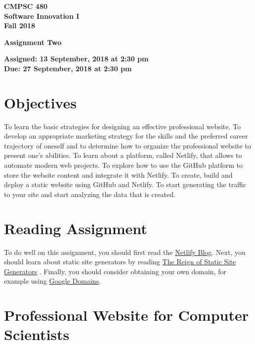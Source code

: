 \documentclass[11pt]{article}
\newcommand{\assignmentduedate}{27 September}
\newcommand{\assignmentassignedate}{ 13 September}
\newcommand{\assignmentnumber}{Two}
\newcommand{\labyear}{2018}
\newcommand{\labtime}{2:30 pm}
\newcommand{\assigneddate}{Assigned:  \assignmentassignedate, \labyear{} at \labtime{}}
\newcommand{\duedate}{Due:  \assignmentduedate, \labyear{} at \labtime{} }
\newcommand{\labtitle}[1]
{
  \begin{center}
    \begin{center}
      \bf
      CMPSC 480 \\ Software Innovation I\\
      Fall 2018\\
      \medskip
    \end{center}
    \bf
    #1
  \end{center}
}
\begin{document}
\thispagestyle{empty}

\labtitle{Assignment \assignmentnumber{} }
\begin{center} \textbf{ \assigneddate{} \\ \duedate{} } \end{center} 
\noindent \textbf{ }

\vspace{-0.05in}
\section*{Objectives}

To learn the basic strategies for designing an effective professional website. To develop an appropriate marketing strategy for the skills and the preferred career trajectory of oneself and to determine how to organize the professional website to present one's abilities. To learn about a platform, called Netlify, that allows to automate modern web projects. To explore how to use the GitHub platform to store the website content and integrate it with Netlify. To create, build and deploy a static website using GitHub and Netlify. To start generating the traffic to your site and start analyzing the data that is created. 

\vspace{-0.05in}
\section*{Reading Assignment}

To do well on this assignment, you
should first read the \href{https://www.netlify.com/blog/}{Netlify Blog}. 
Next, you should learn about static site generators by reading \href{https://www.netlify.com/blog/2018/07/12/the-reign-of-static-site-generators-/}{The Reign of Static Site Generators} .
Finally, you should consider obtaining your own domain, for example using \href{https://domains.google/#/}{Google Domains}.

\vspace{-0.05in}
\section*{Professional Website for Computer Scientists}
\end{document}
